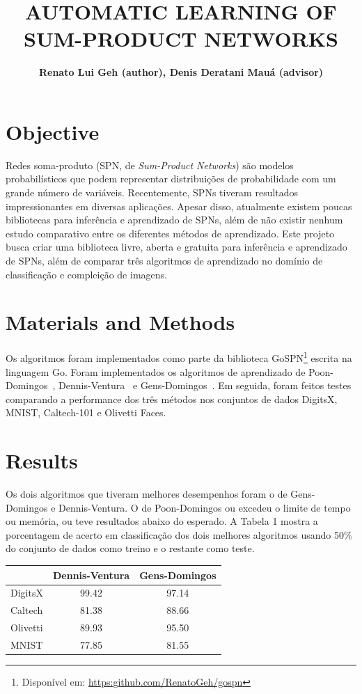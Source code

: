 \documentclass[10pt,a4paper]{article}
\title{AUTOMATIC LEARNING OF SUM-PRODUCT NETWORKS}
\author{\textbf{Renato Lui Geh (author), Denis Deratani Mauá (advisor)}}
\affil{Institute of Mathematics and Statistics, University of São Paulo}
\affil{\fontsize{10pt}{12}\selectfont\{renatolg,ddm\}@ime.usp.br}
\date{}
\begin{document}
\maketitle

\begin{multicols*}{2}

\section*{Objective}

Redes soma-produto (SPN, de \textit{Sum-Product Networks}) são modelos probabilísticos que podem
representar distribuições de probabilidade com um grande número de variáveis.  Recentemente, SPNs
tiveram resultados impressionantes em diversas aplicações.  Apesar disso, atualmente existem poucas
bibliotecas para inferência e aprendizado de SPNs, além de não existir nenhum estudo comparativo
entre os diferentes métodos de aprendizado.  Este projeto busca criar uma biblioteca livre, aberta
e gratuita para inferência e aprendizado de SPNs, além de comparar três algoritmos de aprendizado
no domínio de classificação e compleição de imagens.

\section*{Materials and Methods}

Os algoritmos foram implementados como parte da biblioteca GoSPN\footnote{Disponível em:
  \url{https:github.com/RenatoGeh/gospn}} escrita na linguagem Go.  Foram implementados os
algoritmos de aprendizado de Poon-Domingos~\cite{poon-domingos}, Dennis-Ventura~\cite{clustering} e
Gens-Domingos~\cite{gens-domingos}. Em seguida, foram feitos testes comparando a performance dos
três métodos nos conjuntos de dados DigitsX, MNIST, Caltech-101 e Olivetti Faces.

\section*{Results}

Os dois algoritmos que tiveram melhores desempenhos foram o de Gens-Domingos e Dennis-Ventura. O de
Poon-Domingos ou excedeu o limite de tempo ou memória, ou teve resultados abaixo do esperado. A
Tabela 1 mostra a porcentagem de acerto em classificação dos dois melhores algoritmos usando 50\%
do conjunto de dados como treino e o restante como teste.
\vspace{-0.2cm}
\begin{tabular}{l|c|c}
  & Dennis-Ventura & Gens-Domingos\\
  \hline
  DigitsX & 99.42 & 97.14\\
  Caltech & 81.38 & 88.66\\
  Olivetti& 89.93 & 95.50\\
  MNIST   & 77.85 & 81.55\\
\end{tabular}


\end{multicols*}
\end{document}
